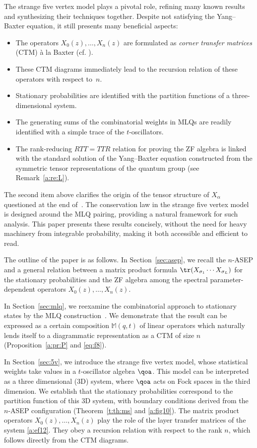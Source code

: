 The strange five vertex model plays a pivotal role, refining many known results~\cite{CDW,CMW,Martin20,PEM} and synthesizing their techniques together.
Despite not satisfying the Yang--Baxter equation, it still presents many beneficial aspects:
\begin{itemize}
\item The operators $X_0(z),\ldots, X_n(z)$ are formulated as \emph{corner transfer matrices} (CTM)  \`a la Baxter (cf. \cite[Chap.13]{Bax}).
\item These CTM diagrams immediately lead to the recursion relation of these operators with respect to~$n$.
\item Stationary probabilities are identified with the partition functions of a three-dimensional system.
\item The generating sums of the combinatorial weights in MLQs are readily identified with a simple trace of the $t$-oscillators.
\item The rank-reducing $RTT=TTR$ relation for proving the ZF algebra is linked with the standard solution of the Yang--Baxter equation constructed from the symmetric tensor representations of the quantum group (see Remark~\ref{a:re:L}).
\end{itemize}

The second item above clarifies the origin of the tensor structure of 
$X_\alpha$ questioned at the end of~\cite[Sec.4.2]{ANP}. 
The conservation law in the strange five vertex model is designed 
around the MLQ pairing, providing a natural framework for such analysis. 
This paper presents these results concisely, without the need for heavy 
machinery from integrable probability, making it both accessible and efficient to read.

The outline of the paper is as follows.
In Section~\ref{sec:asep}, we recall the $n$-ASEP and a general relation between 
a matrix product formula $\tr(X_{\sigma_1}\cdots X_{\sigma_L})$ 
for the stationary probabilities and the ZF algebra among the 
spectral parameter-dependent operators 
$X_0(z),\ldots, X_n(z)$.

In Section~\ref{sec:mlq}, we reexamine  the combinatorial approach to stationary states 
by the MLQ construction~\cite{CMW,Martin20}. 
We demonstrate that the result can be expressed 
as a certain composition $\mathbb{M}(q,t)$ of linear operators 
which naturally lends itself to a diagrammatic representation as a CTM of size $n$ 
(Proposition~\ref{a:pr:P} and \eqref{eq:f8}).

In Section~\ref{sec:5v}, we introduce the strange five vertex model, whose 
statistical weights take values in a $t$-oscillator algebra $\qoa$.
This model can be interpreted as a three dimensional (3D) system, 
where $\qoa$ acts on Fock spaces in the third dimension.
We establish that the stationary probabilities correspond to the partition function of this 3D system, 
with boundary conditions derived from the $n$-ASEP configuration 
(Theorem~\ref{t:th:ms} and \eqref{a:fig10}).
The matrix product operators $X_0(z),\ldots, X_n(z)$ play the  role of  
the layer transfer matrices of the system \eqref{a:ef12}.
They obey a recursion relation with respect to the rank $n$,
 which follows directly from the CTM diagrams.

